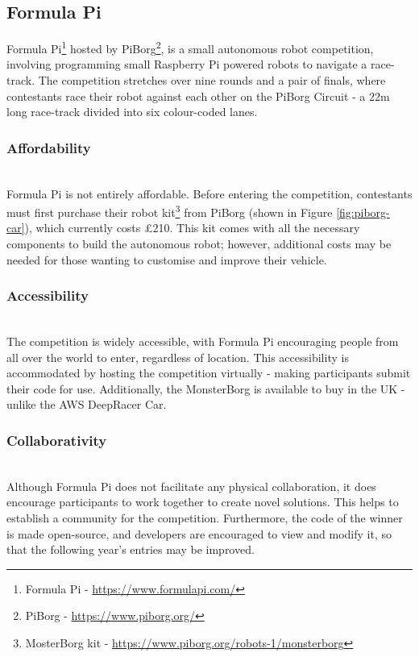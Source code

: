 \documentclass{l4proj}
\begin{document}
\subsection{Formula Pi}\label{sec:formulaPi}
Formula Pi\footnote{Formula Pi - \url{https://www.formulapi.com/}} hosted by PiBorg\footnote{PiBorg - \url{https://www.piborg.org/}}, is a small autonomous robot competition, involving programming small Raspberry Pi powered robots to navigate a race-track. The competition stretches over nine rounds and a pair of finals, where contestants race their robot against each other on the PiBorg Circuit - a 22m long race-track divided into six colour-coded lanes.

\subsubsection{Affordability} \hfill \\
Formula Pi is not entirely affordable. Before entering the competition, contestants must first purchase their robot kit\footnote{MosterBorg kit - \url{https://www.piborg.org/robots-1/monsterborg}} from PiBorg (shown in Figure \ref{fig:piborg-car}), which currently costs £210. This kit comes with all the necessary components to build the autonomous robot; however, additional costs may be needed for those wanting to customise and improve their vehicle.

\subsubsection{Accessibility} \hfill \\
The competition is widely accessible, with Formula Pi encouraging people from all over the world to enter, regardless of location. This accessibility is accommodated by hosting the competition virtually - making participants submit their code for use. Additionally, the MonsterBorg is available to buy in the UK - unlike the AWS DeepRacer Car.

\subsubsection{Collaborativity} \hfill \\
Although Formula Pi does not facilitate any physical collaboration, it does encourage participants to work together to create novel solutions. This helps to establish a community for the competition. Furthermore, the code of the winner is made open-source, and developers are encouraged to view and modify it, so that the following year's entries may be improved.
\end{document}
